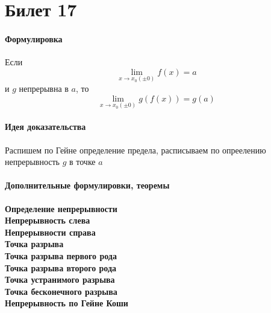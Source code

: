 \documentclass[a4paper,10pt]{article}
\begin{document}
	\section{Билет 17}
	\begin{center} 
		\item \paragraph{Формулировка} 
	\end{center}
	Если \[ \lim_{x \to x_{0}(\pm 0)} f(x) = a \] и $g$ непрерывна в $a$, то \[ \lim_{x \to x_{0}(\pm 0)} g(f(x)) = g(a) \] 
	\begin{center} 
		\item \paragraph{Идея доказательства} 
	\end{center}
	Распишем по Гейне определение предела, расписываем по опреелению непрерывность $g$ в точке $a$
	\begin{center} 
		\item \paragraph{Дополнительные формулировки, теоремы} 
	\end{center}
	\textbf{Определение непрерывности} \\
	\textbf{Непрерывность слева} \\
	\textbf{Непрерывности справа} \\
	\textbf{Точка разрыва} \\
	\textbf{Точка разрыва первого рода} \\
	\textbf{Точка разрыва второго рода} \\
	\textbf{Точка устранимого разрыва} \\
	\textbf{Точка бесконечного разрыва} \\
	\textbf{Непрерывность по Гейне Коши} \\
\end{document}
